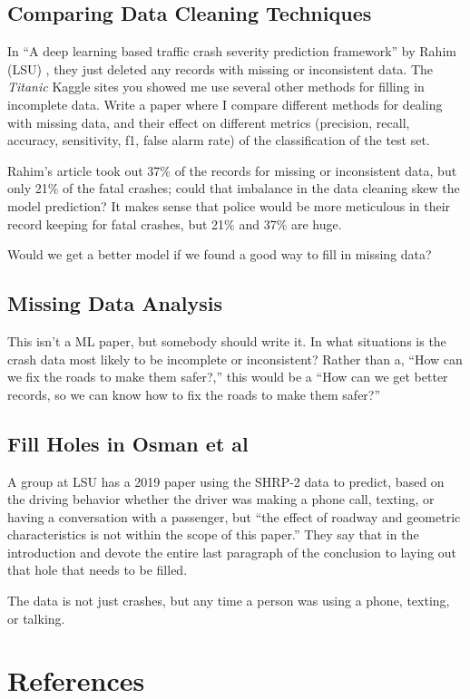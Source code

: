 \documentclass[11pt]{article}
\begin{document}
\begin{spacing}{1.2}
\subsection{Comparing Data Cleaning Techniques}

In ``A deep learning based traffic crash severity prediction framework'' by Rahim (LSU) \cite{RAHIM2021106090}, they just deleted any records with missing or inconsistent data.  The {\it Titanic} Kaggle sites you showed me use several other methods for filling in incomplete data.  Write a paper where I compare different methods for dealing with missing data, and their effect on different metrics (precision, recall, accuracy, sensitivity, f1, false alarm rate) of the classification of the test set.  

Rahim's article took out 37\% of the records for missing or inconsistent data, but only 21\% of the fatal crashes; could that imbalance in the data cleaning skew the model prediction?  It makes sense that police would be more meticulous in their record keeping for fatal crashes, but 21\% and 37\% are huge.  

Would we get a better model if we found a good way to fill in missing data?

\subsection{Missing Data Analysis}

This isn't a ML paper, but somebody should write it.  In what situations is the crash data most likely to be incomplete or inconsistent?  Rather than a, ``How can we fix the roads to make them safer?,'' this would be a ``How can we get better records, so we can know how to fix the roads to make them safer?''

\subsection{Fill Holes in Osman et al}

A group at LSU has a 2019 paper \cite{OSMAN2019274} using the SHRP-2 data to predict, based on the driving behavior whether the driver was making a phone call, texting, or having a conversation with a passenger, but ``the effect of roadway and geometric characteristics is not within the scope of this paper.''  They say that in the introduction and devote the entire last paragraph of the conclusion to laying out that hole that needs to be filled.  

The data is not just crashes, but any time a person was using a phone, texting, or talking.  

\section{References}
\label{sec:references}
\printbibliography[heading=none]





\end{spacing}
\end{document}
